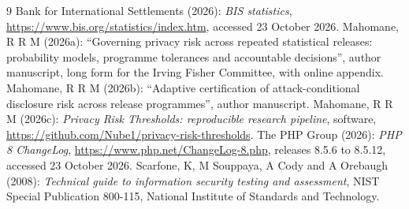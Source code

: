 \documentclass[11pt,a4paper]{article}
\begin{document}
\begin{thebibliography}{9}\small
{}
Bank for International Settlements (2026): \emph{BIS statistics}, \url{https://www.bis.org/statistics/index.htm}, accessed 23 October 2026.
Mahomane, R R M (2026a): ``Governing privacy risk across repeated statistical releases: probability models, programme tolerances and accountable decisions'', author manuscript, long form for the Irving Fisher Committee, with online appendix.
Mahomane, R R M (2026b): ``Adaptive certification of attack-conditional disclosure risk across release programmes'', author manuscript.
Mahomane, R R M (2026c): \emph{Privacy Risk Thresholds: reproducible research pipeline}, software, \url{https://github.com/Nube1/privacy-risk-thresholds}.
The PHP Group (2026): \emph{PHP 8 ChangeLog}, \url{https://www.php.net/ChangeLog-8.php}, releases 8.5.6 to 8.5.12, accessed 23 October 2026.
Scarfone, K, M Souppaya, A Cody and A Orebaugh (2008): \emph{Technical guide to information security testing and assessment}, NIST Special Publication 800-115, National Institute of Standards and Technology.
\end{thebibliography}
\end{document}
